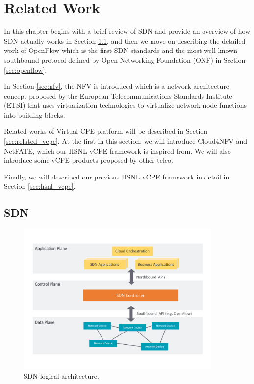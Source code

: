 \chapter{Related Work} \label{ch:related_work}

In this chapter begins with a brief review of SDN and provide an overview of how SDN actually works in Section \ref{sec:sdn}, and then we move on describing the detailed work of OpenFlow which is the first SDN standards and the most well-known southbound protocol defined by Open Networking Foundation (ONF) in Section \ref{sec:openflow}.

In Section \ref{sec:nfv}, the NFV is introduced which is a network architecture concept proposed by the European Telecommunications Standards Institute (ETSI) that uses virtualization technologies to virtualize network node functions into building blocks.

Related works of Virtual CPE platform will be described in Section \ref{sec:related_vcpe}. At the first in this section, we will introduce Cloud4NFV and NetFATE, which our HSNL vCPE framework is inspired from. We will also introduce some vCPE products proposed by other telco.

Finally, we will described our previous HSNL vCPE framework in detail in Section \ref{sec:hsnl_vcpe}.





\section{SDN} \label{sec:sdn}

\begin{figure}[!ht]
\centering
\includegraphics[width=0.9\textwidth]{./fig/sdn_architecture}
\caption{SDN logical architecture.}
\label{fig:sdn_archi}
\end{figure}

